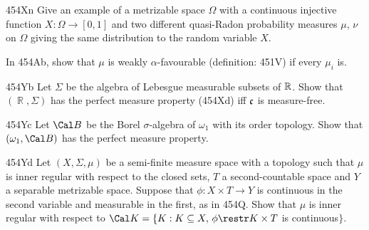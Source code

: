{\spheader 454Xn Give an example of a metrizable space $\Omega$ with a
continuous injective function $X:\Omega\to[0,1]$ and two different
quasi-Radon probability measures $\mu$, $\nu$ on $\Omega$ giving the same
distribution to the random variable $X$.

In 454Ab, show that $\mu$ is weakly $\alpha$-favourable (definition:
451V) if every $\mu_i$ is.

\spheader 454Yb
Let $\Sigma$ be the algebra of Lebesgue measurable
subsets of $\Bbb R$.   Show that $(\BbbR,\Sigma)$ has the perfect
measure property (454Xd) iff $\frak c$ is measure-free.

\spheader 454Yc Let $\Cal B$ be the Borel $\sigma$-algebra of $\omega_1$
with its
order topology.   Show that $(\omega_1,\Cal B)$ has the perfect measure
property.   

\spheader 454Yd Let $(X,\Sigma,\mu)$ be a semi-finite measure space with
a topology such that $\mu$ is inner regular with respect to the closed
sets, $T$ a second-countable space and $Y$ a separable metrizable space.
Suppose that $\phi:X\times T\to Y$ is continuous in the second variable
and measurable in the first, as in 454Q.   Show that $\mu$ is inner
regular with respect to $\Cal K=\{K:K\subseteq X,\,\phi\restr K\times T$
is continuous$\}$.

}%

